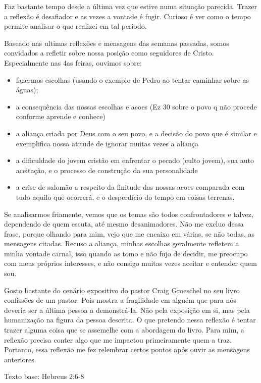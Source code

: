 \documentclass[12pt, legalpaper]{article}
\begin{document}
Faz bastante tempo desde a última vez que estive numa situação parecida. Trazer a reflexão é desafiador e as vezes a vontade é fugir. Curioso é ver como o tempo permite analisar o que realizei em tal periodo.

Baseado nas ultimas reflexões e mensagens das semanas passadas, somos convidados a refletir sobre nossa posição como seguidores de Cristo. Especialmente nas 4as feiras, ouvimos sobre:

\begin{itemize}
   \item fazermos escolhas (usando o exemplo de Pedro ao tentar caminhar sobre as águas);
   \item a consequência das nossas escolhas e acoes (Ez 30 sobre o povo q não procede conforme aprende e conhece)
   \item a aliança criada por Deus com o seu povo, e a decisão do povo que é similar e exemplifica nossa atitude de ignorar muitas vezes a aliança
   \item a dificuldade do jovem cristão em enfrentar o pecado (culto jovem), sua auto aceitação, e o processo de construção da sua personalidade
   \item a crise de salomão a respeito da finitude das nossas acoes comparada com tudo aquilo que ocorrerá, e o desperdício do tempo em coisas terrenas.
\end{itemize}
 
Se analisarmos friamente, vemos que os temas são todos confrontadores e talvez, dependendo de quem escuta, até mesmo desanimadores. Não me excluo dessa frase, porque olhando para mim, vejo que me encaixo em várias, se não todas, as mensagens citadas. Recuso a aliança, minhas escolhas geralmente refletem a minha vontade carnal, isso quando as tomo e não fujo de decidir, me preocupo com meus próprios interesses, e não consigo muitas vezes aceitar e entender quem sou. 

Gosto bastante do cenário expositivo do pastor Craig Groeschel no seu livro confissões de um pastor. Pois mostra a fragilidade em alguém que para nós deveria ser a última pessoa a demonstrá-la. Não pela exposição em si, mas pela humanização na figura da pessoa descrita. O que pretendo nessa reflexão é tentar trazer alguma coisa que se assemelhe com a abordagem do livro. Para mim, a reflexão precisa conter algo que me impactou primeiramente quem a traz. Portanto, essa reflexão me fez relembrar certos pontos após ouvir as mensagens anteriores.

\newpage
Texto base: Hebreus 2:6-8
\end{document}
